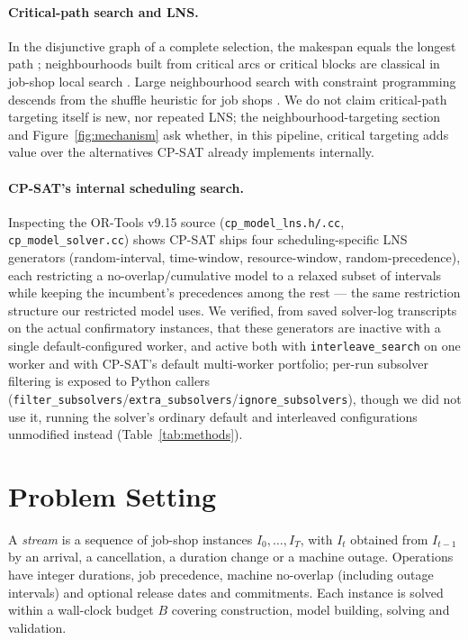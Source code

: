 \documentclass[letterpaper]{article} %
\begin{document}
\paragraph{Critical-path search and LNS.} In the disjunctive graph of a complete selection, the makespan equals the longest path \citep{balas1969}; neighbourhoods built from critical arcs or critical blocks are classical in job-shop local search \citep{vanlaarhoven1992,nowicki1996,balas1998}. Large neighbourhood search with constraint programming \citep{shaw1998,godard2005,pacino2011} descends from the shuffle heuristic for job shops \citep{applegate1991}. We do not claim critical-path targeting itself is new, nor repeated LNS; the neighbourhood-targeting section and Figure~\ref{fig:mechanism} ask whether, in this pipeline, critical targeting adds value over the alternatives CP-SAT already implements internally.

\paragraph{CP-SAT's internal scheduling search.} Inspecting the OR-Tools v9.15 source (\texttt{cp\_model\_lns.h/.cc}, \texttt{cp\_model\_solver.cc}) shows CP-SAT ships four scheduling-specific LNS generators (random-interval, time-window, resource-window, random-precedence), each restricting a no-overlap/cumulative model to a relaxed subset of intervals while keeping the incumbent's precedences among the rest --- the same restriction structure our restricted model uses. We verified, from saved solver-log transcripts on the actual confirmatory instances, that these generators are inactive with a single default-configured worker, and active both with \texttt{interleave\_search} on one worker and with CP-SAT's default multi-worker portfolio; per-run subsolver filtering is exposed to Python callers (\texttt{fil\-ter\_\-sub\-solvers}/\texttt{ex\-tra\_\-sub\-solvers}/\texttt{ig\-nore\_\-sub\-solvers}), though we did not use it, running the solver's ordinary default and interleaved configurations unmodified instead (Table~\ref{tab:methods}).

\section{Problem Setting}
\label{sec:setting}

A \emph{stream} is a sequence of job-shop instances $I_0,\dots,I_T$, with $I_t$ obtained from $I_{t-1}$ by an arrival, a cancellation, a duration change or a machine outage. Operations have integer durations, job precedence, machine no-overlap (including outage intervals) and optional release dates and commitments. Each instance is solved within a wall-clock budget $B$ covering construction, model building, solving and validation.
\end{document}
